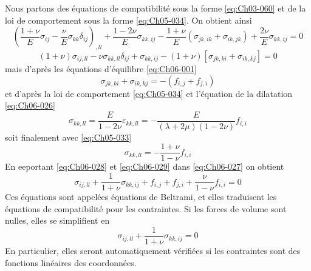 Nous partons des équations de compatibilité sous la forme \eqref{eq:Ch03-060} et de la loi de comportement sous la forme \eqref{eq:Ch05-034}.
On obtient ainsi
\begin{equation*}
    \left( \frac{1+\nu}{E} \sigma_{ij} - \frac{\nu}{E} \sigma_{kk} \delta_{ij} \right)_{,ll} + \frac{1 - 2\nu}{E} \sigma_{kk,ij} - \frac{1+ \nu}{E} \left( \sigma_{jk,ik} + \sigma_{ik,jk} \right) + \frac{2\nu}{E} \sigma_{kk,ij} = 0
\end{equation*}
\begin{equation}
    \left( 1+\nu \right)\sigma_{ij,ll} - \nu \sigma_{kk,ll} \delta_{ij} + \sigma_{kk,ij} - \left( 1+\nu \right) \left[ \sigma_{jk,ki} + \sigma_{ik,kj} \right] = 0
    \label{eq:Ch06-027}
\end{equation}
mais d'après les équations d'équilibre \eqref{eq:Ch06-001}
\begin{equation}
    \sigma_{jk,ki} + \sigma_{ik,kj} = - \left( f_{i,j} + f_{j,i} \right)
    \label{eq:Ch06-028}
\end{equation}
et d'après la loi de comportement \eqref{eq:Ch05-034} et l'équation de la dilatation \eqref{eq:Ch06-026}
\begin{equation*}
    \sigma_{kk,ll} = \frac{E}{1-2\nu} \varepsilon_{kk,ll} = - \frac{E}{\left( \lambda + 2\mu \right)\left( 1-2\nu \right)}f_{i,i}
\end{equation*}
soit finalement avec \eqref{eq:Ch05-033}
\begin{equation}
    \sigma_{kk,ll} = - \frac{1+\nu}{1-\nu} f_{i,i}
    \label{eq:Ch06-029}
\end{equation}
En eeportant \eqref{eq:Ch06-028} et \eqref{eq:Ch06-029} dans \eqref{eq:Ch06-027} on obtient
\begin{equation}
    \sigma_{ij,ll} + \frac{1}{1+\nu} \sigma_{kk,ij} + f_{i,j} + f_{j,i} + \frac{\nu}{1-\nu} f_{i,i} = 0
    \label{eq:Ch06-030}
\end{equation}
Ces équations sont appelées équations de Beltrami, et elles traduisent les équations de compatibilité pour les contraintes.
Si les forces de volume sont nulles, elles se simplifient en
\begin{equation}
    \sigma_{ij,ll} + \frac{1}{1+\nu} \sigma_{kk,ij} = 0
    \label{eq:Ch06-031}
\end{equation}
En particulier, elles seront automatiquement vérifiées si les contraintes sont des fonctions linéaires des coordonnées.

